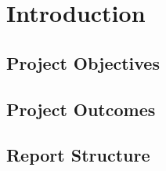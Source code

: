 \documentclass[report.tex]{subfiles}
\begin{document}
\chapter{Introduction} %
\label{cha:introduction}
\section{Project Objectives} %
\label{sec:project_objectives}

\section{Project Outcomes} %
\label{sec:project_outcomes}

\section{Report Structure} %
\label{sec:report_structure}

\newpage
\end{document}
